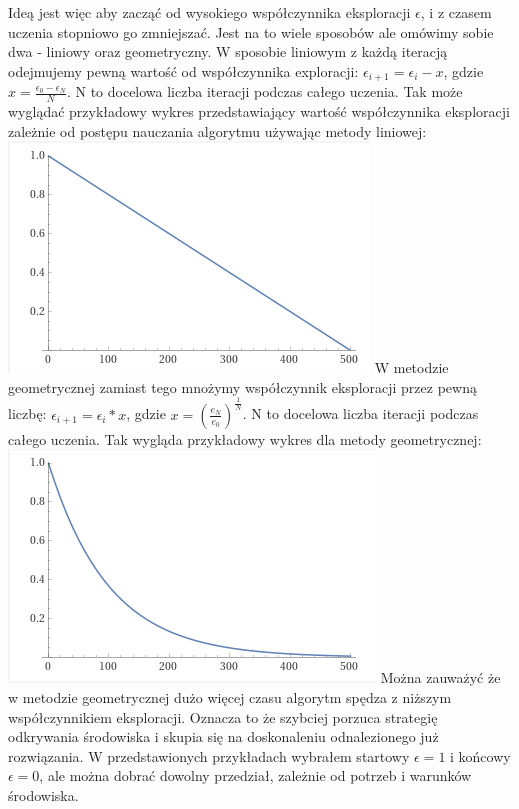 \documentclass[a4paper,12pt]{article}
\begin{document}
Ideą jest więc aby zacząć od wysokiego współczynnika eksploracji \(\epsilon\), i z czasem uczenia stopniowo go zmniejszać. Jest na to wiele sposobów ale omówimy sobie dwa - liniowy oraz geometryczny. W sposobie liniowym z każdą iteracją odejmujemy pewną wartość od współczynnika exploracji: \(\epsilon_{i+1} = \epsilon_{i} - x\), gdzie \(x =  \frac{\epsilon_{0} - \epsilon_{N}}{N}\). N to docelowa liczba iteracji podczas całego uczenia. 
\newline \newline Tak może wyglądać przykładowy wykres przedstawiający wartość współczynnika eksploracji zależnie od postępu nauczania algorytmu używając metody liniowej:
\newline \includegraphics{lin.png}
\newline
W metodzie geometrycznej zamiast tego mnożymy współczynnik eksploracji przez pewną liczbę: \(\epsilon_{i+1} = \epsilon_{i} * x\), gdzie \(x = (\frac{e_{N}}{e_{0}})^\frac{1}{N} \). N to docelowa liczba iteracji podczas całego uczenia. 
\newline Tak wygląda przykładowy wykres dla metody geometrycznej:
\newline \includegraphics{geo.png}
\newline Można zauważyć że w metodzie geometrycznej dużo więcej czasu algorytm spędza z niższym współczynnikiem eksploracji. Oznacza to że szybciej porzuca strategię odkrywania środowiska i skupia się na doskonaleniu odnalezionego już rozwiązania. W przedstawionych przykładach wybrałem startowy \(\epsilon = 1\) i końcowy \(\epsilon = 0\), ale można dobrać dowolny przedział, zależnie od potrzeb i warunków środowiska.  
\end{document}
